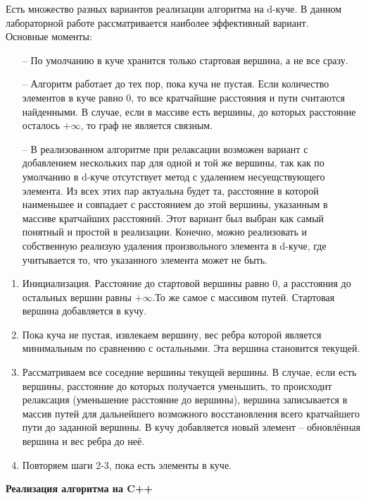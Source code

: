 \begin{text}
Есть множество разных вариантов реализации алгоритма на d-куче. В данном лабораторной работе рассматривается наиболее эффективный вариант.\\
Основные моменты:
\begin{enumerate}
	\item[--] По умолчанию в куче хранится только стартовая вершина, а не все сразу.
	\item[--] Алгоритм работает до тех пор, пока куча не пустая. Если количество элементов в куче равно $0$, то все кратчайшие расстояния и пути считаются найденными. В случае, если в массиве есть вершины, до которых расстояние осталось $+\infty$, то граф не является связным.
	\item[--] В реализованном алгоритме при релаксации возможен вариант с добавлением нескольких пар для одной и той же вершины, так как по умолчанию в d-куче отсутствует метод с удалением несуещствующего элемента. Из всех этих пар актуальна будет та, расстояние в которой наименьшее и совпадает с расстоянием до этой вершины, указанным в массиве кратчайших расстояний. Этот вариант был выбран как самый понятный и простой в реализации. Конечно, можно реализовать и собственную реализую удаления произвольного элемента в d-куче, где учитывается то, что указанного элемента может не быть.
\end{enumerate}

\begin{enumerate}
	\item Инициализация. Расстояние до стартовой вершины равно $0$, а расстояния до остальных вершин равны $+\infty$.То же самое с массивом путей. Стартовая вершина добавляется в кучу.
	\item Пока куча не пустая, извлекаем вершину, вес ребра которой является минимальным по сравнению с остальными. Эта вершина становится текущей.
	\item Рассматриваем все соседние вершины текущей вершины. В случае, если есть вершины, расстояние до которых получается уменьшить, то происходит релаксация (уменьшение расстояние до вершины), вершина записывается в массив путей для дальнейшего возможного восстановления всего кратчайшего пути до заданной вершины. В кучу добавляется новый элемент -- обновлённая вершина и вес ребра до неё.
	\item Повторяем шаги 2-3, пока есть элементы в куче.
\end{enumerate}

\newpage
\begin{center}
\textbf{Реализация алгоритма на C++}
\end{center}


\end{text}
